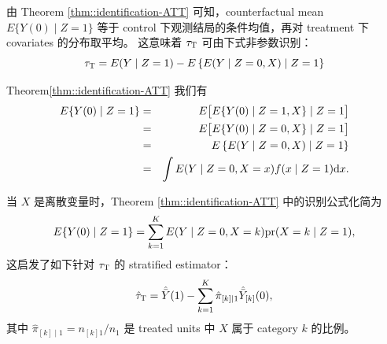 由 Theorem \ref{thm::identification-ATT} 可知，counterfactual mean $ E\{    Y(0) \mid Z=1 \}  $ 等于 control 下观测结局的条件均值，再对 treatment 下 covariates 的分布取平均。
这意味着 $\tau_\textsc{T} $ 可由下式非参数识别：
\begin{equation}
\tau_\textsc{T}  = E(Y\mid Z=1) -E\left\{  E(    Y \mid Z=0 , X) \mid  Z=1  \right\}  \label{eq::att-identification} 
\end{equation}

\begin{myproof}{Theorem}{\ref{thm::identification-ATT}} 
我们有
\begin{eqnarray*}
 E\{    Y(0) \mid Z=1 \} &=&  E\big[   E\{    Y(0) \mid Z=1 , X\} \mid  Z=1  \big] \\
 &=& E\big[   E\{    Y(0) \mid Z=0 , X\} \mid  Z=1  \big] \\
 &=& E\left\{  E(    Y \mid Z=0 , X) \mid  Z=1  \right\} \\
 &=& \int  E(    Y \mid Z=0 , X=x) f(  x \mid Z=1)  \textup{d} x.
\end{eqnarray*}
\end{myproof}


当 $X$ 是离散变量时，Theorem \ref{thm::identification-ATT} 中的识别公式化简为
$$
 E\{    Y(0) \mid Z=1 \}  = \sum_{k=1}^K E(    Y \mid Z=0 , X=k) \textup{pr}(X=k \mid  Z=1  ),
$$
%
这启发了如下针对 $\tau_\textsc{T} $ 的 stratified estimator：
$$
\hat{\tau}_\textsc{T} =   \hat{\bar{Y}}(1) - \sum_{k=1}^K \hat{\pi}_{[k]\mid 1} \hat{\bar{Y}}_{[k]}(0),
$$
其中 $\hat{\pi}_{[k]\mid 1} = n_{[k]1}/n_1$ 是 treated units 中 $X$ 属于 category $k$ 的比例。


